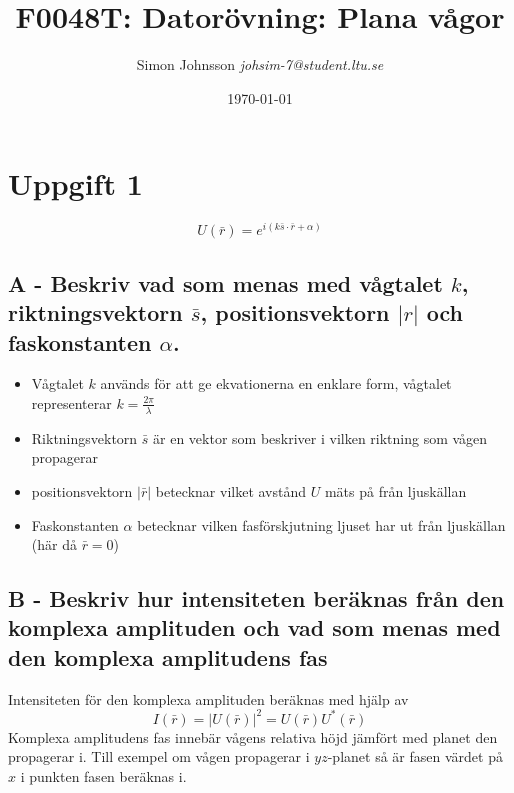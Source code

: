 \documentclass{article}
\begin{document}
\title{F0048T: Datorövning: Plana vågor}
\author{Simon Johnsson \textit{johsim-7@student.ltu.se}}
\date{\today}
\maketitle

\section*{Uppgift 1}
  \[
    U(\bar{r})=e^{i(k\bar{s}\cdot\bar{r}+\alpha)}
  \]
  \subsection*{A - Beskriv vad som menas med vågtalet $k$, riktningsvektorn $\bar{s}$, positionsvektorn $|r|$ och faskonstanten $\alpha$.}
    \begin{itemize}
      \item Vågtalet $k$ används för att ge ekvationerna en enklare form, vågtalet representerar $k=\frac{2\pi}{\lambda}$
      \item Riktningsvektorn $\bar{s}$ är en vektor som beskriver i vilken riktning som vågen propagerar
      \item positionsvektorn $|\bar{r}|$ betecknar vilket avstånd $U$ mäts på från ljuskällan
      \item Faskonstanten $\alpha$ betecknar vilken fasförskjutning ljuset har ut från ljuskällan (här då $\bar{r}=0$)
    \end{itemize}
  \subsection*{B - Beskriv hur intensiteten beräknas från den komplexa amplituden och vad som menas med den komplexa amplitudens fas}
    Intensiteten för den komplexa amplituden beräknas med hjälp av
    \[
      I(\bar{r})=|U(\bar{r})|^2=U(\bar{r})U^*(\bar{r})
    \]
    Komplexa amplitudens fas innebär vågens relativa höjd jämfört med planet den propagerar i. Till exempel om vågen propagerar i $yz$-planet så är fasen värdet på $x$ i punkten fasen beräknas i.
\end{document}
